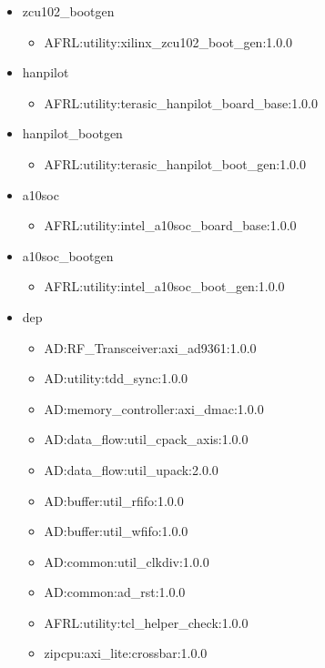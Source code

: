 \begin{itemize}
\begin{itemize}
	\end{itemize}
\item zcu102\_bootgen
	\begin{itemize}
	\item AFRL:utility:xilinx\_zcu102\_boot\_gen:1.0.0
	\end{itemize}
\item hanpilot
	\begin{itemize}
	\item AFRL:utility:terasic\_hanpilot\_board\_base:1.0.0
	\end{itemize}
\item hanpilot\_bootgen
	\begin{itemize}
	\item AFRL:utility:terasic\_hanpilot\_boot\_gen:1.0.0
	\end{itemize}
\item a10soc
	\begin{itemize}
	\item AFRL:utility:intel\_a10soc\_board\_base:1.0.0
	\end{itemize}
\item a10soc\_bootgen
	\begin{itemize}
	\item AFRL:utility:intel\_a10soc\_boot\_gen:1.0.0
	\end{itemize}
\item dep
	\begin{itemize}
	\item AD:RF\_Transceiver:axi\_ad9361:1.0.0
	\item AD:utility:tdd\_sync:1.0.0
	\item AD:memory\_controller:axi\_dmac:1.0.0
	\item AD:data\_flow:util\_cpack\_axis:1.0.0
	\item AD:data\_flow:util\_upack:2.0.0
	\item AD:buffer:util\_rfifo:1.0.0
	\item AD:buffer:util\_wfifo:1.0.0
	\item AD:common:util\_clkdiv:1.0.0
	\item AD:common:ad\_rst:1.0.0
	\item AFRL:utility:tcl\_helper\_check:1.0.0
	\item zipcpu:axi\_lite:crossbar:1.0.0
	\end{itemize}
\end{itemize}
